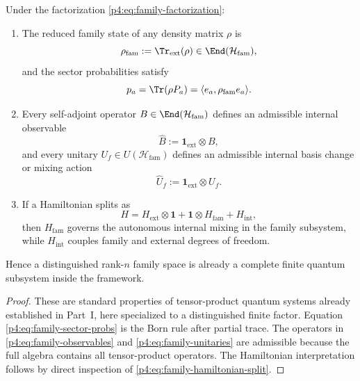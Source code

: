 \documentclass[12pt,a4paper]{article}
\begin{document}
\begin{proposition}
\label{p4:prop:finite-family-factors}
Under the factorization \eqref{p4:eq:family-factorization}:
\begin{enumerate}[label=(\roman*)]
\item The reduced family state of any density matrix $\rho$ is
\begin{equation}
\label{p4:eq:reduced-family-state}
\rho_{\mathrm{fam}}:=\Tr_{\mathrm{ext}}(\rho)\in \End(\mathcal H_{\mathrm{fam}}),
\end{equation}
and the sector probabilities satisfy
\begin{equation}
\label{p4:eq:family-sector-probs}
p_a=\Tr(\rho P_a)=\langle e_a,\rho_{\mathrm{fam}}e_a\rangle.
\end{equation}
\item Every self-adjoint operator $B\in\End(\mathcal H_{\mathrm{fam}})$ defines an admissible internal observable
\begin{equation}
\label{p4:eq:family-observables}
\widehat B:=\mathbf 1_{\mathrm{ext}}\otimes B,
\end{equation}
and every unitary $U_f\in U(\mathcal H_{\mathrm{fam}})$ defines an admissible internal basis change or mixing action
\begin{equation}
\label{p4:eq:family-unitaries}
\widehat U_f:=\mathbf 1_{\mathrm{ext}}\otimes U_f.
\end{equation}
\item If a Hamiltonian splits as
\begin{equation}
\label{p4:eq:family-hamiltonian-split}
H=H_{\mathrm{ext}}\otimes \mathbf 1 + \mathbf 1\otimes H_{\mathrm{fam}} + H_{\mathrm{int}},
\end{equation}
then $H_{\mathrm{fam}}$ governs the autonomous internal mixing in the family subsystem, while $H_{\mathrm{int}}$ couples family and external degrees of freedom.
\end{enumerate}
Hence a distinguished rank-$n$ family space is already a complete finite quantum subsystem inside the framework.
\end{proposition}

\begin{proof}
These are standard properties of tensor-product quantum systems already established in Part~I, here specialized to a distinguished finite factor.
Equation \eqref{p4:eq:family-sector-probs} is the Born rule after partial trace.
The operators in \eqref{p4:eq:family-observables} and \eqref{p4:eq:family-unitaries} are admissible because the full algebra contains all tensor-product operators.
The Hamiltonian interpretation follows by direct inspection of \eqref{p4:eq:family-hamiltonian-split}.
\end{proof}
\end{document}
